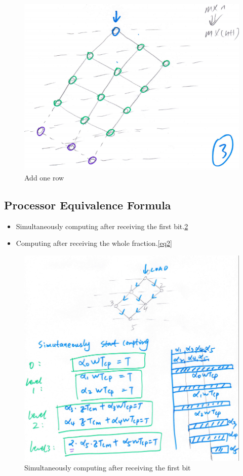 \documentclass[preprint,12pt]{elsarticle}
\begin{document}
\begin{figure}[h]
\centering\includegraphics[width=1\linewidth]{unitmesh6}
\caption{Add one row }
\label{unitmesh6}
\end{figure}




\subsection{Processor Equivalence Formula}


\begin{itemize}
	\item Simultaneously computing after receiving the first bit.\ref{eq1}
    \item Computing after receiving the whole fraction.\ref{eq2}
\end{itemize}

\begin{figure}[h]
\centering\includegraphics[width=1\linewidth]{eq1}
\caption{Simultaneously computing after receiving the first bit }
\label{eq1}
\end{figure}
\end{document}

